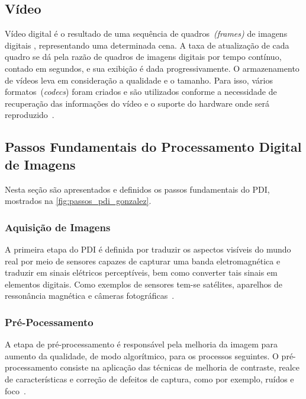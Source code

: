 \documentclass[12pt,oneside,a4paper,chapter=TITLE,section=TITLE,sumario=tradicional]{abntex2}
\begin{document}
\subsection{Vídeo}

Vídeo digital é o resultado de uma sequência de quadros~\textit{(frames)} de imagens digitais , representando uma determinada cena. A taxa de atualização de cada quadro se dá pela razão de quadros de imagens digitais por tempo contínuo, contado em segundos, e sua exibição é dada progressivamente.
O armazenamento de vídeos leva em consideração a qualidade e o tamanho. Para isso, vários formatos~(\textit{codecs}) foram criados e são utilizados conforme a necessidade de recuperação das informações do vídeo e o suporte do hardware onde será reproduzido~\cite[p.6]{de2013arquitetura}.

\subsection{Passos Fundamentais do Processamento Digital de Imagens}

Nesta seção são apresentados e definidos os passos fundamentais do PDI, mostrados na \autoref{fig:passos_pdi_gonzalez}.

\begin{figure}[htb]
\end{figure}

\subsubsection{Aquisição de Imagens}

A primeira etapa do PDI é definida por traduzir os aspectos visíveis do mundo real por meio de sensores capazes de capturar uma banda eletromagnética e traduzir em sinais elétricos perceptíveis, bem como converter tais sinais em elementos digitais. Como exemplos de sensores tem-se satélites, aparelhos de ressonância magnética e câmeras fotográficas~\cite[p.7–10]{pdi2006}.

\subsubsection{Pré-Pocessamento}

A etapa de pré-processamento é responsável pela melhoria da imagem para aumento da qualidade, de modo algorítmico, para os processos seguintes. O pré-processamento consiste na aplicação das técnicas de melhoria de contraste, realce de características e correção de defeitos de captura, como por exemplo, ruídos e foco~\cite[p.6]{pdi2006}.
\end{document}
